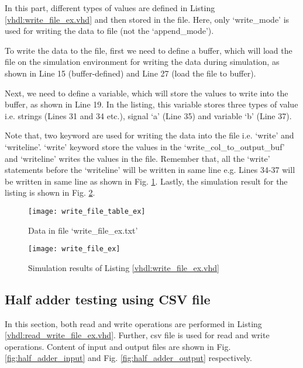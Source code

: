 In this part, different types of values are defined in Listing \ref{vhdl:write_file_ex.vhd} and then stored in the file. Here, only `write\_mode' is used for writing the data to file (not the `append\_mode'). 

\begin{explanation}
	To write the data to the file, first we need to define a buffer, which will load the file on the simulation environment for writing the data during simulation,  as shown in Line 15 (buffer-defined) and Line 27 (load the file to buffer). 
	
	Next, we need to define a variable, which will store the values to write into the buffer, as shown in Line 19. In the listing, this variable stores three types of value i.e. strings (Lines 31 and 34 etc.), signal `a' (Line 35) and variable `b' (Line 37). 
	
	Note that, two keyword are used for writing the data into the file i.e. `write' and `writeline'. `write' keyword store the values in the `write\_col\_to\_output\_buf' and `writeline' writes the values in the file. Remember that, all the `write' statements before the `writeline' will be written in same line e.g. Lines 34-37 will be written in same line as shown in Fig. \ref{fig:write_file_table_ex}. Lastly, the simulation result for the listing is shown in Fig. \ref{fig:write_file_ex}. 
\end{explanation}





\begin{figure}[!h]
	\centering
	\texttt{[image: write\_file\_table\_ex]}
	\caption{Data in file  `write\_file\_ex.txt'}
	\label{fig:write_file_table_ex}
\end{figure}

\begin{figure}[!h]
	\centering
	\texttt{[image: write\_file\_ex]}
	\caption{Simulation results of Listing \ref{vhdl:write_file_ex.vhd} }
	\label{fig:write_file_ex}
\end{figure}


\subsection{Half adder testing using CSV file}
In this section, both read and write operations are performed in Listing \ref{vhdl:read_write_file_ex.vhd}. Further, csv file is used for read and write operations. Content of input and output files are shown in Fig. \ref{fig:half_adder_input} and Fig. \ref{fig:half_adder_output} respectively. 

